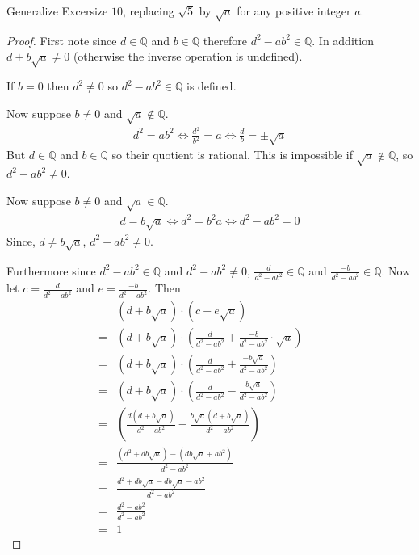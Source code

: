 \begin{tcolorbox}[title=Problem 11, breakable]
    Generalize Excersize $10$, replacing $\sqrt{5}$ by $\sqrt{a}$ for any positive integer $a$.
\end{tcolorbox}

\begin{proof}
    First note since $d \in \mathbb{Q}$ and $b \in \mathbb{Q}$ therefore $d^2 - ab^2 \in \mathbb{Q}$.
    In addition $d + b\sqrt{a} \not = 0$ (otherwise the inverse operation is undefined).

    If $b = 0$ then $d^2 \not = 0$ so $d^2 - ab^2 \in \mathbb{Q}$ is defined.

    Now suppose $b \not = 0$ and $\sqrt{a} \not \in \mathbb{Q}$.
    \begin{align*}
        d^2 = ab^2 \iff \frac{d^2}{b^2} = a \iff \frac{d}{b} = \pm \sqrt{a}
    \end{align*}
    But $d \in \mathbb{Q}$ and $b \in \mathbb{Q}$ so their quotient is rational.
    This is impossible if $\sqrt{a} \notin \mathbb{Q}$, so $d^2 - ab^2 \neq 0$.

    Now suppose $b \not = 0$ and $\sqrt{a} \in \mathbb{Q}$.
    \begin{align*}
        d = b\sqrt{a} \iff d^2 = b^2 a \iff d^2 - ab^2 = 0
    \end{align*}
    Since, $d \not = b\sqrt{a}$, $d^2 - ab^2 \not = 0$.

    Furthermore since $d^2 - ab^2 \in \mathbb{Q}$ and $d^2 - ab^2 \not = 0$,
        $\frac{d}{d^2 - ab^2} \in \mathbb{Q}$ and $\frac{-b}{d^2 - ab^2} \in \mathbb{Q}$.
    Now let $c = \frac{d}{d^2 - ab^2}$ and $e = \frac{-b}{d^2 - ab^2}$.
    Then
    \begin{align*}
        & (d + b\sqrt{a}) \cdot (c + e\sqrt{a}) && \\
        = &(d + b\sqrt{a}) \cdot \left(\frac{d}{d^2 - ab^2} + \frac{-b}{d^2 - ab^2} \cdot \sqrt{a}\right) && \\
        = &(d + b\sqrt{a}) \cdot \left(\frac{d}{d^2 - ab^2} + \frac{-b\sqrt{a}}{d^2 - ab^2}\right) && \\
        = &(d + b\sqrt{a}) \cdot \left(\frac{d}{d^2 - ab^2} - \frac{b\sqrt{a}}{d^2 - ab^2}\right) && \\
        = &\left(\frac{d(d + b\sqrt{a})}{d^2 - ab^2} - \frac{b\sqrt{a}(d + b\sqrt{a})}{d^2 - ab^2}\right) && \\
        = &\frac{(d^2 + db\sqrt{a}) - (db\sqrt{a} + ab^2)}{d^2 - ab^2} && \\
        = &\frac{d^2 + db\sqrt{a} - db\sqrt{a} - ab^2}{d^2 - ab^2} && \\
        = &\frac{d^2 - ab^2}{d^2 - ab^2} && \\
        = &1
    \end{align*}
\end{proof}

